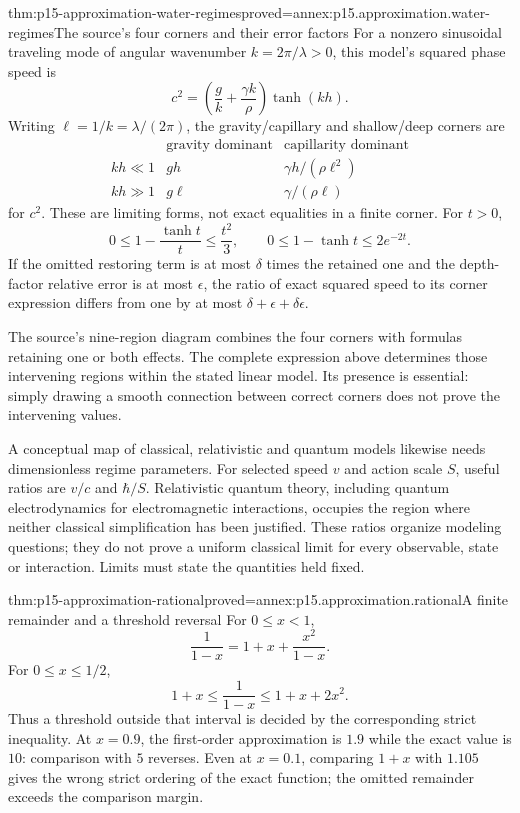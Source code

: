 \begin{hbtheorem}{thm:p15-approximation-water-regimes}{proved=annex:p15.approximation.water-regimes}{The source's four corners and their error factors}
For a nonzero sinusoidal traveling mode of angular wavenumber
\(k=2\pi/\lambda>0\), this model's squared phase speed is
\[
 c^2=\left(\frac gk+\frac{\gamma k}{\rho}\right)\tanh(kh).
\]
Writing \(\ell=1/k=\lambda/(2\pi)\), the gravity/capillary and shallow/deep corners are
\[
\begin{array}{c|cc}
 &\text{gravity dominant}&\text{capillarity dominant}\\\hline
 kh\ll1&gh&\gamma h/(\rho\ell^2)\\
 kh\gg1&g\ell&\gamma/(\rho\ell)
\end{array}
\]
for \(c^2\). These are limiting forms, not exact equalities in a finite
corner. For \(t>0\),
\[
 0\leq1-\frac{\tanh t}{t}\leq\frac{t^2}{3},\qquad
 0\leq1-\tanh t\leq2e^{-2t}.
\]
If the omitted restoring term is at most \(\delta\) times the retained
one and the depth-factor relative error is at most \(\epsilon\), the
ratio of exact squared speed to its corner expression differs from one
by at most \(\delta+\epsilon+\delta\epsilon\).
\end{hbtheorem}

The source's nine-region diagram combines the four corners with formulas
retaining one or both effects. The complete expression above determines
those intervening regions within the stated linear model. Its presence is
essential: simply drawing a smooth connection between correct corners does
not prove the intervening values.

A conceptual map of classical, relativistic and quantum models likewise
needs dimensionless regime parameters. For selected speed \(v\) and action
scale \(S\), useful ratios are \(v/c\) and \(\hbar/S\). Relativistic
quantum theory, including quantum electrodynamics for electromagnetic
interactions, occupies the region where neither classical simplification
has been justified. These ratios organize modeling questions; they do not
prove a uniform classical limit for every observable, state or interaction.
Limits must state the quantities held fixed.

\begin{hbtheorem}{thm:p15-approximation-rational}{proved=annex:p15.approximation.rational}{A finite remainder and a threshold reversal}
For \(0\leq x<1\),
\[
 \frac1{1-x}=1+x+\frac{x^2}{1-x}.
\]
For \(0\leq x\leq1/2\),
\[
 1+x\leq\frac1{1-x}\leq1+x+2x^2.
\]
Thus a threshold outside that interval is decided by the corresponding
strict inequality. At \(x=0.9\), the first-order approximation is \(1.9\)
while the exact value is \(10\): comparison with \(5\) reverses.
Even at \(x=0.1\), comparing \(1+x\) with \(1.105\) gives the wrong
strict ordering of the exact function; the omitted remainder exceeds the
comparison margin.
\end{hbtheorem}

